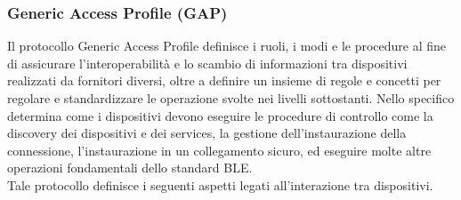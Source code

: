 \subsubsection{Generic Access Profile (GAP)}
Il protocollo Generic Access Profile definisce i ruoli, i modi e le procedure al fine di assicurare l'interoperabilità e lo scambio di informazioni tra dispositivi realizzati da fornitori diversi, oltre a definire un insieme di regole e concetti per regolare e standardizzare le operazione svolte nei livelli sottostanti.
Nello specifico determina come i dispositivi devono eseguire le procedure di controllo come la discovery dei dispositivi e dei services, la gestione dell'instaurazione della connessione, l'instaurazione in un collegamento sicuro, ed eseguire molte altre operazioni fondamentali dello standard BLE.\\

\noindent Tale protocollo definisce i seguenti aspetti legati all'interazione tra dispositivi.
